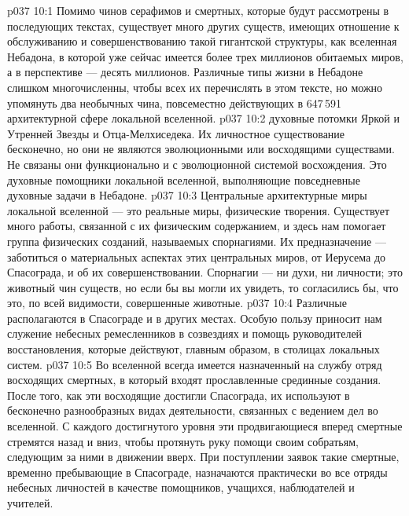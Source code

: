 \vs p037 10:1 Помимо чинов серафимов и смертных, которые будут рассмотрены в последующих текстах, существует много других существ, имеющих отношение к обслуживанию и совершенствованию такой гигантской структуры, как вселенная Небадона, в которой уже сейчас имеется более трех миллионов обитаемых миров, а в перспективе --- десять миллионов. Различные типы жизни в Небадоне слишком многочисленны, чтобы всех их перечислять в этом тексте, но можно упомянуть два необычных чина, повсеместно действующих в 647\,591 архитектурной сфере локальной вселенной.
\vs p037 10:2 \pc {} духовные потомки Яркой и Утренней Звезды и Отца\hyp{}Мелхиседека. Их личностное существование бесконечно, но они не являются эволюционными или восходящими существами. Не связаны они функционально и с эволюционной системой восхождения. Это духовные помощники локальной вселенной, выполняющие повседневные духовные задачи в Небадоне.
\vs p037 10:3 \pc {} Центральные архитектурные миры локальной вселенной --- это реальные миры, физические творения. Существует много работы, связанной с их физическим содержанием, и здесь нам помогает группа физических созданий, называемых спорнагиями. Их предназначение --- заботиться о материальных аспектах этих центральных миров, от Иерусема до Спасограда, и об их совершенствовании. Спорнагии --- ни духи, ни личности; это животный чин существ, но если бы вы могли их увидеть, то согласились бы, что это, по всей видимости, совершенные животные.
\vs p037 10:4 \pc Различные  располагаются в Спасограде и в других местах. Особую пользу приносит нам служение небесных ремесленников в созвездиях и помощь руководителей восстановления, которые действуют, главным образом, в столицах локальных систем.
\vs p037 10:5 Во вселенной всегда имеется назначенный на службу отряд восходящих смертных, в который входят прославленные срединные создания. После того, как эти восходящие достигли Спасограда, их используют в бесконечно разнообразных видах деятельности, связанных с ведением дел во вселенной. С каждого достигнутого уровня эти продвигающиеся вперед смертные стремятся назад и вниз, чтобы протянуть руку помощи своим собратьям, следующим за ними в движении вверх. При поступлении заявок такие смертные, временно пребывающие в Спасограде, назначаются практически во все отряды небесных личностей в качестве помощников, учащихся, наблюдателей и учителей.
